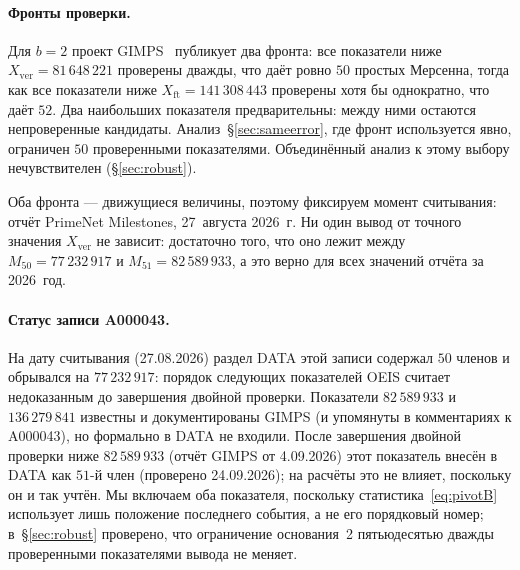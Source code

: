\documentclass[11pt,a4paper]{article}
\theoremstyle{plain}
\theoremstyle{remark}
\begin{document}
\paragraph{Фронты проверки.} Для $b=2$ проект GIMPS~\cite{gimps} публикует два фронта:
все показатели ниже $X_{\mathrm{ver}}=81\,648\,221$ проверены дважды, что даёт ровно $50$
простых Мерсенна, тогда как все показатели ниже $X_{\mathrm{ft}}=141\,308\,443$ проверены
хотя бы однократно, что даёт $52$. Два наибольших показателя предварительны: между ними
остаются непроверенные кандидаты. Анализ~\S\ref{sec:sameerror}, где фронт используется
явно, ограничен $50$ проверенными показателями. Объединённый анализ к этому выбору
нечувствителен (\S\ref{sec:robust}).

Оба фронта --- движущиеся величины, поэтому фиксируем момент считывания: отчёт
PrimeNet Milestones, 27~августа 2026~г. Ни один вывод от точного значения
$X_{\mathrm{ver}}$ не зависит: достаточно того, что оно лежит между
$M_{50}=77\,232\,917$ и $M_{51}=82\,589\,933$, а это верно для всех значений отчёта
за 2026~год.

\paragraph{Статус записи A000043.} На дату считывания (27.08.2026) раздел DATA этой
записи содержал $50$ членов и обрывался на $77\,232\,917$: порядок следующих
показателей OEIS считает недоказанным до завершения двойной проверки. Показатели
$82\,589\,933$ и $136\,279\,841$ известны и документированы GIMPS (и упомянуты в
комментариях к A000043), но формально в DATA не входили. После завершения двойной
проверки ниже $82\,589\,933$ (отчёт GIMPS от 4.09.2026) этот показатель внесён в
DATA как $51$-й член (проверено 24.09.2026); на расчёты это не влияет, поскольку он
и так учтён. Мы включаем оба показателя, поскольку статистика~\eqref{eq:pivotB} использует лишь положение
последнего события, а не его порядковый номер; в~\S\ref{sec:robust} проверено, что
ограничение основания~2 пятьюдесятью дважды проверенными показателями вывода не меняет.
\end{document}
